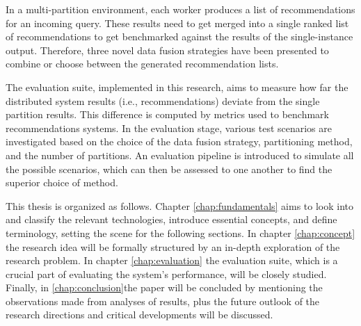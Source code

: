 In a multi-partition environment, each worker produces a list of recommendations for an incoming query. These results need to get merged into a single ranked list of recommendations to get benchmarked against the results of the single-instance output. Therefore, three novel data fusion strategies have been presented to combine or choose between the generated recommendation lists.


The evaluation suite, implemented in this research, aims to measure how far the distributed system results (i.e., recommendations) deviate from the single partition results. This difference is computed by metrics used to benchmark recommendations systems. In the evaluation stage, various test scenarios are investigated based on the choice of the data fusion strategy, partitioning method, and the number of partitions. An evaluation pipeline is introduced to simulate all the possible scenarios, which can then be assessed to one another to find the superior choice of method.


This thesis is organized as follows. Chapter \ref{chap:fundamentals} aims to look into and classify the relevant technologies, introduce essential concepts, and define terminology, setting the scene for the following sections. In chapter \ref{chap:concept} the research idea will be formally structured by an in-depth exploration of the research problem. In chapter \ref{chap:evaluation} the evaluation suite, which is a crucial part of evaluating the system's performance, will be closely studied. Finally, in \ref{chap:conclusion}the paper will be concluded by mentioning the observations made from analyses of results, plus the future outlook of the research directions and critical developments will be discussed.